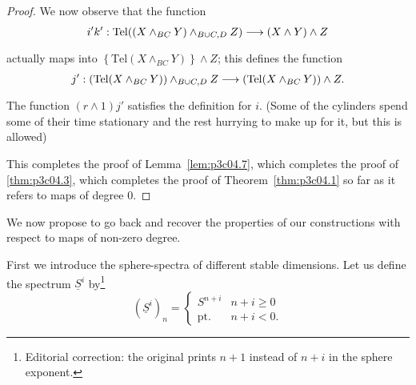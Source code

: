\documentclass[../main]{subfiles}
\begin{document}
\begin{proof}
We now observe that the function \[i'k' : \mathrm{Tel}((X \wedge_{BC} Y) \wedge_{B \cup C, D} Z) \lar{} (X \wedge Y) \wedge Z\] actually maps into $\left\{\mathrm{Tel}(X \wedge_{BC} Y)\right\} \wedge Z$; this defines the function \[j' : (\mathrm{Tel}(X \wedge_{BC} Y)) \wedge_{B \cup C, D} Z \lar{} (\mathrm{Tel}(X \wedge_{BC} Y)) \wedge Z.\] The function $(r \wedge 1) j'$ satisfies the definition for $i$. (Some of the cylinders spend some of their time stationary and the rest hurrying to make up for it, but this is allowed)

This completes the proof of Lemma~\ref{lem:p3c04.7}, which completes the proof of \ref{thm:p3c04.3}, which completes the proof of Theorem~\ref{thm:p3c04.1} so far as it refers to maps of degree $0$. 
\end{proof}

We now propose to go back and recover the properties of our constructions with respect to maps of non-zero degree.

First we introduce the sphere-spectra of different stable dimensions. Let us define the spectrum $\underline S^i$ by\footnote{Editorial correction: the original prints $n+1$ instead of $n+i$ in the sphere exponent.} \[(\underline S^i)_n = \begin{cases}S^{n + i} & n + i \ge 0 \\ \mathrm{pt.} & n + i < 0.\end{cases}\]
\end{document}
